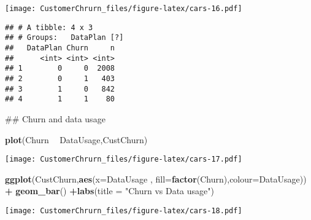 \documentclass[]{article}
\newenvironment{Shaded}{\begin{snugshade}}{\end{snugshade}}
\newcommand{\KeywordTok}[1]{\textcolor[rgb]{0.13,0.29,0.53}{\textbf{#1}}}
\newcommand{\DataTypeTok}[1]{\textcolor[rgb]{0.13,0.29,0.53}{#1}}
\newcommand{\StringTok}[1]{\textcolor[rgb]{0.31,0.60,0.02}{#1}}
\newcommand{\CommentTok}[1]{\textcolor[rgb]{0.56,0.35,0.01}{\textit{#1}}}
\newcommand{\OperatorTok}[1]{\textcolor[rgb]{0.81,0.36,0.00}{\textbf{#1}}}
\newcommand{\NormalTok}[1]{#1}
\begin{document}
\texttt{[image: CustomerChrurn\_files/figure-latex/cars-16.pdf]}

\begin{Shaded}
\end{Shaded}

\begin{verbatim}
## # A tibble: 4 x 3
## # Groups:   DataPlan [?]
##   DataPlan Churn     n
##      <int> <int> <int>
## 1        0     0  2008
## 2        0     1   403
## 3        1     0   842
## 4        1     1    80
\end{verbatim}

\begin{Shaded}
\begin{Highlighting}[]
\NormalTok{## Churn and data usage}

\KeywordTok{plot}\NormalTok{(Churn }\OperatorTok{~}\StringTok{ }\NormalTok{DataUsage,CustChurn)}
\end{Highlighting}
\end{Shaded}

\texttt{[image: CustomerChrurn\_files/figure-latex/cars-17.pdf]}

\begin{Shaded}
\begin{Highlighting}[]
\KeywordTok{ggplot}\NormalTok{(CustChurn,}\KeywordTok{aes}\NormalTok{(}\DataTypeTok{x=}\NormalTok{DataUsage  , }\DataTypeTok{fill=}\KeywordTok{factor}\NormalTok{(Churn),}\DataTypeTok{colour=}\NormalTok{DataUsage))  }\OperatorTok{+}\StringTok{ }\KeywordTok{geom_bar}\NormalTok{() }\OperatorTok{+}\KeywordTok{labs}\NormalTok{(}\DataTypeTok{title =} \StringTok{"Churn vs Data usage"}\NormalTok{)}
\end{Highlighting}
\end{Shaded}

\texttt{[image: CustomerChrurn\_files/figure-latex/cars-18.pdf]}

\begin{Shaded}
\end{Shaded}
\end{document}

